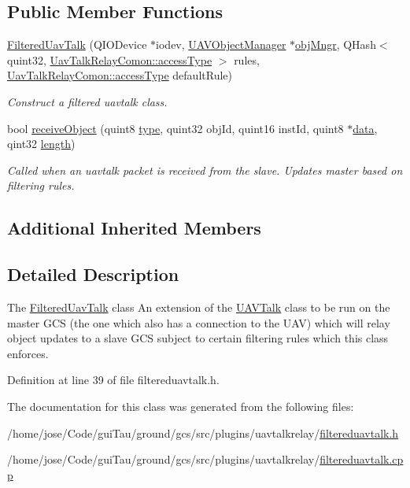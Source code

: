\subsection*{Public Member Functions}
\begin{DoxyCompactItemize}
\item 
\hyperlink{group___u_a_v_talk_ga618403abe72042a54b38faa22c1c5e5f}{Filtered\-Uav\-Talk} (Q\-I\-O\-Device $\ast$iodev, \hyperlink{class_u_a_v_object_manager}{U\-A\-V\-Object\-Manager} $\ast$\hyperlink{group___u_a_v_talk_plugin_ga096422f1ff46ea45de07a92c41827aa5}{obj\-Mngr}, Q\-Hash$<$ quint32, \hyperlink{group___u_a_v_talk_plugin_gae73e1677650d617d825cf2224fa0626a}{Uav\-Talk\-Relay\-Comon\-::access\-Type} $>$ rules, \hyperlink{group___u_a_v_talk_plugin_gae73e1677650d617d825cf2224fa0626a}{Uav\-Talk\-Relay\-Comon\-::access\-Type} default\-Rule)
\begin{DoxyCompactList}\small\item\em Construct a filtered uavtalk class. \end{DoxyCompactList}\item 
bool \hyperlink{group___u_a_v_talk_gae0a55c71a396a0577dd48dad6188a7a0}{receive\-Object} (quint8 \hyperlink{glext_8h_a7d05960f4f1c1b11f3177dc963a45d86}{type}, quint32 obj\-Id, quint16 inst\-Id, quint8 $\ast$\hyperlink{glext_8h_a8850df0785e6fbcc2351af3b686b8c7a}{data}, qint32 \hyperlink{glext_8h_a3c8469415bbc83dd1341af15c67f1cef}{length})
\begin{DoxyCompactList}\small\item\em Called when an uavtalk packet is received from the slave. Updates master based on filtering rules. \end{DoxyCompactList}\end{DoxyCompactItemize}
\subsection*{Additional Inherited Members}


\subsection{Detailed Description}
The \hyperlink{class_filtered_uav_talk}{Filtered\-Uav\-Talk} class An extension of the \hyperlink{class_u_a_v_talk}{U\-A\-V\-Talk} class to be run on the master G\-C\-S (the one which also has a connection to the U\-A\-V) which will relay object updates to a slave G\-C\-S subject to certain filtering rules which this class enforces. 

Definition at line 39 of file filtereduavtalk.\-h.



The documentation for this class was generated from the following files\-:\begin{DoxyCompactItemize}
\item 
/home/jose/\-Code/gui\-Tau/ground/gcs/src/plugins/uavtalkrelay/\hyperlink{filtereduavtalk_8h}{filtereduavtalk.\-h}\item 
/home/jose/\-Code/gui\-Tau/ground/gcs/src/plugins/uavtalkrelay/\hyperlink{filtereduavtalk_8cpp}{filtereduavtalk.\-cpp}\end{DoxyCompactItemize}
